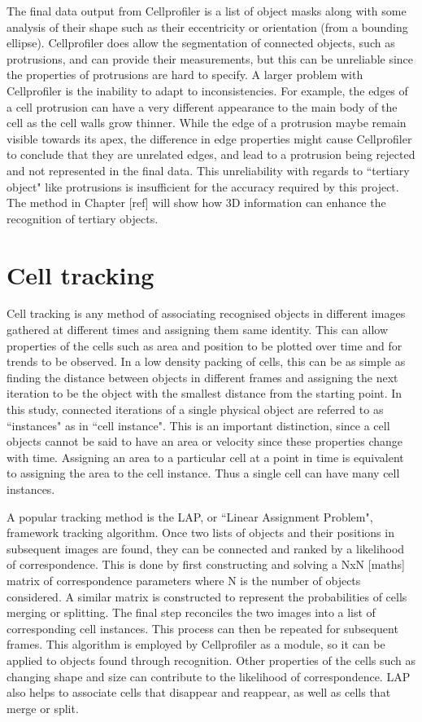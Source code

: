 The final data output from Cellprofiler is a list of object masks along with some analysis of their shape such as their eccentricity or orientation (from a bounding ellipse). Cellprofiler does allow the segmentation of connected objects, such as protrusions, and can provide their measurements, but this can be unreliable since the properties of protrusions are hard to specify. A larger problem with Cellprofiler is the inability to adapt to inconsistencies. For example, the edges of a cell protrusion can have a very different appearance to the main body of the cell as the cell walls grow thinner. While the edge of a protrusion maybe remain visible towards its apex, the difference in edge properties might cause Cellprofiler to conclude that they are unrelated edges, and lead to a protrusion being rejected and not represented in the final data. This unreliability with regards to ``tertiary object" like protrusions is insufficient for the accuracy required by this project. The method in Chapter [ref] will show how 3D information can enhance the recognition of tertiary objects.

\section{Cell tracking}

Cell tracking is any method of associating recognised objects in different images gathered at different times and assigning them same identity. This can allow properties of the cells such as area and position to be plotted over time and for trends to be observed. In a low density packing of cells, this can be as simple as finding the distance between objects in different frames and assigning the next iteration to be the object with the smallest distance from the starting point. In this study, connected iterations of a single physical object are referred to as ``instances" as in ``cell instance". This is an important distinction, since a cell objects cannot be said to have an area or velocity since these properties change with time. Assigning an area to a particular cell at a point in time is equivalent to assigning the area to the cell instance. Thus a single cell can have many cell instances.

A popular tracking method is the LAP, or ``Linear Assignment Problem", framework tracking algorithm. Once two lists of objects and their positions in subsequent images are found, they can be connected and ranked by a likelihood of correspondence. This is done by first constructing and solving a NxN [maths] matrix of correspondence parameters where N is the number of objects considered. A similar matrix is constructed to represent the probabilities of cells merging or splitting. The final step reconciles the two images into a list of corresponding cell instances. This process can then be repeated for subsequent frames. This algorithm is employed by Cellprofiler as a module, so it can be applied to objects found through recognition. Other properties of the cells such as changing shape and size can contribute to the likelihood of correspondence. LAP also helps to associate cells that disappear and reappear, as well as cells that merge or split.

